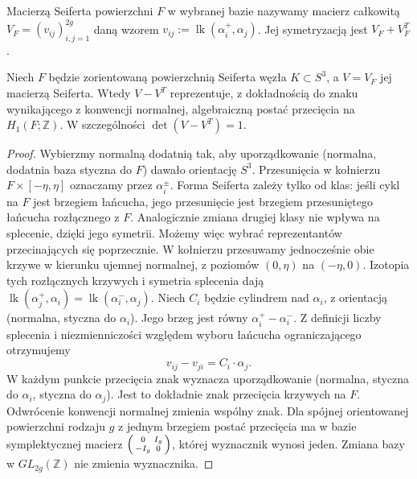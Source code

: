 \begin{definicja}
Macierzą Seiferta powierzchni $F$ w wybranej bazie nazywamy
macierz całkowitą $V_F=(v_{ij})_{i,j=1}^{2g}$ daną wzorem
$v_{ij}:=\operatorname{lk}(\alpha_i^+,\alpha_j)$.
Jej symetryzacją jest $V_F+V_F^T$.
\end{definicja}

\begin{stwierdzenie}
Niech $F$ będzie zorientowaną powierzchnią Seiferta węzła
$K\subset S^3$, a $V=V_F$ jej macierzą Seiferta. Wtedy
$V-V^T$ reprezentuje, z dokładnością do znaku wynikającego
z konwencji normalnej, algebraiczną postać przecięcia
na $H_1(F;\mathbb Z)$. W szczególności $\det(V-V^T)=1$.
\end{stwierdzenie}

\begin{proof}
Wybierzmy normalną dodatnią tak, aby uporządkowanie
(normalna, dodatnia baza styczna do $F$) dawało orientację $S^3$.
Przesunięcia w kołnierzu $F\times[-\eta,\eta]$ oznaczamy
przez $\alpha_i^\pm$. Forma Seiferta zależy tylko od klas:
jeśli cykl na $F$ jest brzegiem łańcucha, jego przesunięcie
jest brzegiem przesuniętego łańcucha rozłącznego z $F$.
Analogicznie zmiana drugiej klasy nie wpływa na splecenie,
dzięki jego symetrii. Możemy więc wybrać reprezentantów
przecinających się poprzecznie.
W kołnierzu przesuwamy jednocześnie obie krzywe w kierunku
ujemnej normalnej, z poziomów $(0,\eta)$ na $(-\eta,0)$.
Izotopia tych rozłącznych krzywych i symetria splecenia dają
$\operatorname{lk}(\alpha_j^+,\alpha_i)
=\operatorname{lk}(\alpha_i^-,\alpha_j)$.
Niech $C_i$ będzie cylindrem nad $\alpha_i$, z orientacją
(normalna, styczna do $\alpha_i$). Jego brzeg jest równy
$\alpha_i^+-\alpha_i^-$. Z definicji liczby splecenia
i niezmienniczości względem wyboru łańcucha ograniczającego
otrzymujemy
\[
v_{ij}-v_{ji}=C_i\cdot\alpha_j.
\]
W każdym punkcie przecięcia znak wyznacza uporządkowanie
(normalna, styczna do $\alpha_i$, styczna do $\alpha_j$).
Jest to dokładnie znak przecięcia krzywych na $F$.
Odwrócenie konwencji normalnej zmienia wspólny znak. Dla spójnej
orientowanej powierzchni rodzaju $g$ z jednym brzegiem
postać przecięcia ma w bazie symplektycznej macierz
$\begin{psmallmatrix}0&I_g\\-I_g&0\end{psmallmatrix}$,
której wyznacznik wynosi jeden. Zmiana bazy w $GL_{2g}(\mathbb Z)$
nie zmienia wyznacznika.
\end{proof}

